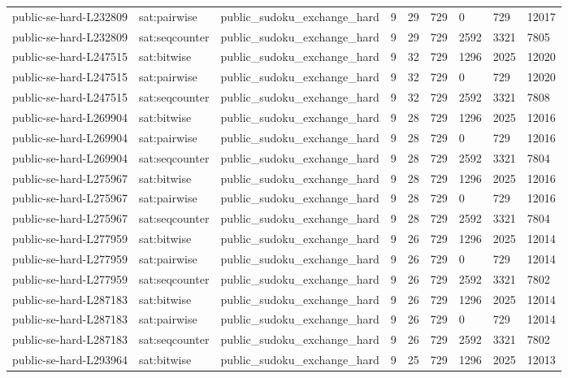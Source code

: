 \begin{tabular}{lllllllll}
public-se-hard-L232809 & sat:pairwise & public\_sudoku\_exchange\_hard & 9 & 29 & 729 & 0 & 729 & 12017 \\
public-se-hard-L232809 & sat:seqcounter & public\_sudoku\_exchange\_hard & 9 & 29 & 729 & 2592 & 3321 & 7805 \\
public-se-hard-L247515 & sat:bitwise & public\_sudoku\_exchange\_hard & 9 & 32 & 729 & 1296 & 2025 & 12020 \\
public-se-hard-L247515 & sat:pairwise & public\_sudoku\_exchange\_hard & 9 & 32 & 729 & 0 & 729 & 12020 \\
public-se-hard-L247515 & sat:seqcounter & public\_sudoku\_exchange\_hard & 9 & 32 & 729 & 2592 & 3321 & 7808 \\
public-se-hard-L269904 & sat:bitwise & public\_sudoku\_exchange\_hard & 9 & 28 & 729 & 1296 & 2025 & 12016 \\
public-se-hard-L269904 & sat:pairwise & public\_sudoku\_exchange\_hard & 9 & 28 & 729 & 0 & 729 & 12016 \\
public-se-hard-L269904 & sat:seqcounter & public\_sudoku\_exchange\_hard & 9 & 28 & 729 & 2592 & 3321 & 7804 \\
public-se-hard-L275967 & sat:bitwise & public\_sudoku\_exchange\_hard & 9 & 28 & 729 & 1296 & 2025 & 12016 \\
public-se-hard-L275967 & sat:pairwise & public\_sudoku\_exchange\_hard & 9 & 28 & 729 & 0 & 729 & 12016 \\
public-se-hard-L275967 & sat:seqcounter & public\_sudoku\_exchange\_hard & 9 & 28 & 729 & 2592 & 3321 & 7804 \\
public-se-hard-L277959 & sat:bitwise & public\_sudoku\_exchange\_hard & 9 & 26 & 729 & 1296 & 2025 & 12014 \\
public-se-hard-L277959 & sat:pairwise & public\_sudoku\_exchange\_hard & 9 & 26 & 729 & 0 & 729 & 12014 \\
public-se-hard-L277959 & sat:seqcounter & public\_sudoku\_exchange\_hard & 9 & 26 & 729 & 2592 & 3321 & 7802 \\
public-se-hard-L287183 & sat:bitwise & public\_sudoku\_exchange\_hard & 9 & 26 & 729 & 1296 & 2025 & 12014 \\
public-se-hard-L287183 & sat:pairwise & public\_sudoku\_exchange\_hard & 9 & 26 & 729 & 0 & 729 & 12014 \\
public-se-hard-L287183 & sat:seqcounter & public\_sudoku\_exchange\_hard & 9 & 26 & 729 & 2592 & 3321 & 7802 \\
public-se-hard-L293964 & sat:bitwise & public\_sudoku\_exchange\_hard & 9 & 25 & 729 & 1296 & 2025 & 12013 \\

\end{tabular}
